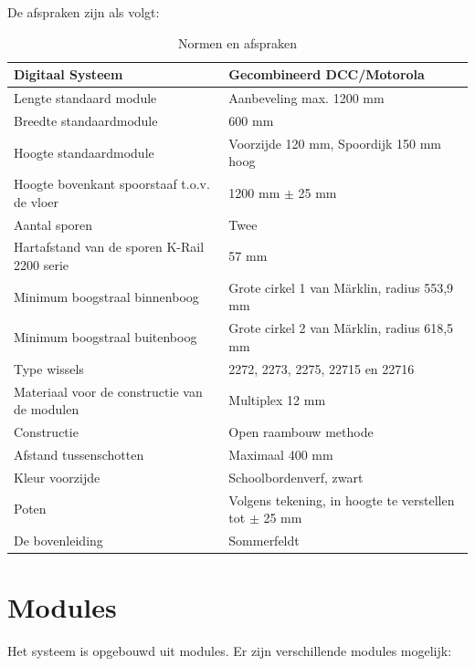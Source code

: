 \documentclass[12pt,a4paper]{report}
\newcommand*{\marklin}{M\"{a}rklin}
\begin{document}
De afspraken zijn als volgt:

\begin{table}[h!]
\begin{tabular}{| l |p{7cm}|}
\hline
\cellcolor[gray]{0.84}Digitaal Systeem & Gecombineerd DCC/Motorola\\
\hline
\cellcolor[gray]{0.84}Lengte standaard module & Aanbeveling max. 1200 mm\\
\hline
\cellcolor[gray]{0.84}Breedte standaardmodule & 600 mm\\
\hline
\cellcolor[gray]{0.84}Hoogte standaardmodule & Voorzijde 120 mm, Spoordijk 150 mm hoog\\
\hline
\cellcolor[gray]{0.84}Hoogte bovenkant spoorstaaf t.o.v. de vloer&1200 mm $\pm$ 25 mm\\
\hline
\cellcolor[gray]{0.84}Aantal sporen&Twee\\
\hline
\cellcolor[gray]{0.84}Hartafstand van de sporen K-Rail 2200 serie&57 mm\\
\hline
\cellcolor[gray]{0.84}Minimum boogstraal binnenboog&Grote cirkel 1 van \marklin, radius 553,9 mm\\
\hline
\cellcolor[gray]{0.84}Minimum boogstraal buitenboog&Grote cirkel 2 van \marklin, radius 618,5 mm\\
\hline
\cellcolor[gray]{0.84}Type wissels&2272, 2273, 2275, 22715 en 22716\\
\hline
\cellcolor[gray]{0.84}Materiaal voor de constructie van de modulen&Multiplex 12 mm\\
\hline
\cellcolor[gray]{0.84}Constructie&Open raambouw methode\\
\hline
\cellcolor[gray]{0.84}Afstand tussenschotten&Maximaal 400 mm\\
\hline
\cellcolor[gray]{0.84}Kleur voorzijde&Schoolbordenverf, zwart\\
\hline
\cellcolor[gray]{0.84}Poten&Volgens tekening, in hoogte te verstellen tot $\pm$ 25 mm\\
\hline
\cellcolor[gray]{0.84}De bovenleiding&Sommerfeldt\\
\hline
\end{tabular}
\caption{Normen en afspraken}
\end{table}

\chapter{Modules}
\label{ch:modules}
Het systeem is opgebouwd uit modules. Er zijn verschillende modules mogelijk:
\end{document}
